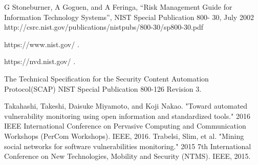 \documentclass{llncs}
\begin{document}
\newpage
\begin{thebibliography}{[MT1]}

%


G Stoneburner, A Goguen, and A Feringa, “Risk Management Guide
for Information Technology Systems”, NIST Special Publication 800-
30, July 2002
http://csrc.nist.gov/publications/nistpubs/800-30/sp800-30.pdf

https://www.nist.gov/ .

https://nvd.nist.gov/ .



The Technical Specification for the
Security Content Automation Protocol(SCAP)
NIST Special Publication 800-126
Revision 3.


Takahashi, Takeshi, Daisuke Miyamoto, and Koji Nakao. "Toward automated vulnerability monitoring using open information and standardized tools." 2016 IEEE International Conference on Pervasive Computing and Communication Workshops (PerCom Workshops). IEEE, 2016.
Trabelsi, Slim, et al. "Mining social networks for software vulnerabilities monitoring." 2015 7th International Conference on New Technologies, Mobility and Security (NTMS). IEEE, 2015.
%
\end{thebibliography}
\end{document}
